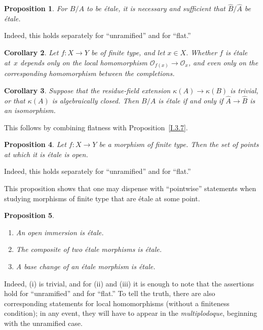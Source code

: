 \documentclass[11pt,oneside]{amsbook}
\newtheorem{proposition}{Proposition}[section]
\newtheorem{corollary}[proposition]{Corollary}
\theoremstyle{remark}
\theoremstyle{plain}
\numberwithin{equation}{section}
\begin{document}
\begin{proposition}
\label{I.4.2}
For \(B/A\) to be étale, it is necessary and sufficient that
\(\widehat B/\widehat A\) be étale.
\end{proposition}

Indeed, this holds separately for ``unramified'' and for ``flat.''

\begin{corollary}
\label{I.4.3}
Let \(f\colon X\to Y\) be of finite type, and let \(x\in X\).  Whether
\(f\) is étale at~\(x\) depends only on the local homomorphism
\(\mathcal O_{f(x)}\to\mathcal O_x\), and even only on the corresponding
homomorphism between the completions.
\end{corollary}

\begin{corollary}
\label{I.4.4}
Suppose that the residue-field extension
\(\kappa(A)\to\kappa(B)\) is trivial, or that \(\kappa(A)\) is
algebraically closed.  Then \(B/A\) is étale if and only if
\(\widehat A\to\widehat B\) is an isomorphism.
\end{corollary}

This follows by combining flatness with Proposition~\ref{I.3.7}.

\begin{proposition}
\label{I.4.5}
Let \(f\colon X\to Y\) be a morphism of finite type.  Then the set of
points at which it is étale is open.
\end{proposition}

Indeed, this holds separately for ``unramified'' and for ``flat.''

This proposition shows that one may dispense with ``pointwise'' statements
when studying morphisms of finite type that are étale at some point.

\begin{proposition}
\label{I.4.6}
\begin{enumerate}
\item[(i)] An open immersion is étale.
\item[(ii)] The composite of two étale morphisms is étale.
\item[(iii)] A base change of an étale morphism is étale.
\end{enumerate}
\end{proposition}

%
Indeed, \textup{(i)} is trivial, and for \textup{(ii)} and \textup{(iii)}
it is enough to note that the assertions hold for ``unramified'' and for
``flat.''  To tell the truth, there are also corresponding statements for
local homomorphisms (without a finiteness condition); in any event, they will
have to appear in the \emph{multiplodoque}, beginning with the unramified
case.
\end{document}
